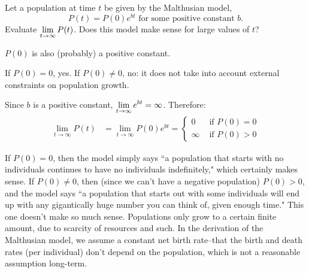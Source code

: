 %
%



\subsection*{\Conceptual}


\begin{question}
Let a population at time $t$ be given by the Malthusian model,
\[P(t)=P(0)e^{bt}\mbox{ for some positive constant $b$.}\]
Evaluate $\displaystyle\lim_{t \to \infty}P(t)$. Does this model make sense for large values of $t$?
\end{question}
\begin{hint}
$P(0)$ is also (probably) a positive constant.
\end{hint}
\begin{answer}
If $P(0)=0$, yes. If $P(0) \neq 0$,
no: it does not take into account external constraints on population growth.
\end{answer}
\begin{solution}
Since $b$ is a positive constant, $\displaystyle\lim_{t \to \infty}e^{bt}=\infty$. Therefore:
\begin{align*}
\lim_{t \to \infty}P(t)&=\lim_{t \to \infty} P(0)e^{bt}
=\left\{\begin{array}{cc}
0&\mbox{ if }P(0)=0\\
\infty&\mbox{ if }P(0)>0
\end{array}\right.
\end{align*}

If $P(0)=0$, then the model simply says ``a population that starts with no individuals continues to have no individuals indefinitely," which certainly makes sense. If $P(0) \neq 0$, then (since we can't have a negative population) $P(0)>0$, and the model says ``a population that starts out with some individuals will end up with any gigantically huge number you can think of, given enough time." This one doesn't make so much sense. Populations only grow to a certain finite amount, due to scarcity of resources and such. In the derivation of the Malthusian model, we assume a constant net birth rate--that the birth and death rates (per individual) don't depend on the population, which is not a reasonable assumption long-term.
\end{solution}




